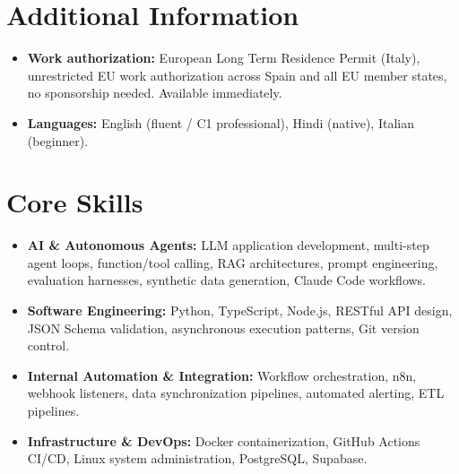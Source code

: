 \documentclass[a4paper,10pt]{article}
\begin{document}
\section{Additional Information}
\begin{itemize}
 \item \textbf{Work authorization:} European Long Term Residence Permit (Italy), unrestricted EU work authorization across Spain and all EU member states, no sponsorship needed. Available immediately.
 \item \textbf{Languages:} English (fluent / C1 professional), Hindi (native), Italian (beginner).
\end{itemize}

\section{Core Skills}
\begin{itemize}
 \item \textbf{AI \& Autonomous Agents:} LLM application development, multi-step agent loops, function/tool calling, RAG architectures, prompt engineering, evaluation harnesses, synthetic data generation, Claude Code workflows.
 \item \textbf{Software Engineering:} Python, TypeScript, Node.js, RESTful API design, JSON Schema validation, asynchronous execution patterns, Git version control.
 \item \textbf{Internal Automation \& Integration:} Workflow orchestration, n8n, webhook listeners, data synchronization pipelines, automated alerting, ETL pipelines.
 \item \textbf{Infrastructure \& DevOps:} Docker containerization, GitHub Actions CI/CD, Linux system administration, PostgreSQL, Supabase.
\end{itemize}
\end{document}
